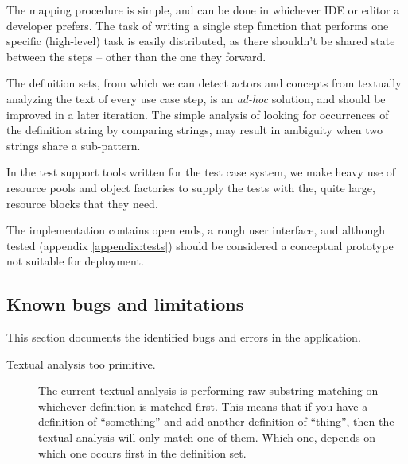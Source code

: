 \noindent The mapping procedure is simple, and can be done in whichever IDE or editor a developer prefers. The task of writing a single step function that performs one specific (high-level) task is easily distributed, as there shouldn't be shared state between the steps -- other than the one they forward.\medskip

\noindent The definition sets, from which we can detect actors and concepts from textually analyzing the text of every use case step, is an \emph{
ad-hoc} solution, and should be improved in a later iteration. The simple analysis of looking for occurrences of the definition string by comparing strings, may result in ambiguity when two strings share a sub-pattern.\medskip

\noindent In the test support tools written for the test case system, we make heavy use of resource pools and object factories to supply the tests with the, quite large, resource blocks that they need.\medskip

\noindent The implementation contains open ends, a rough user interface, and although tested (appendix \ref{appendix:tests}) should be considered a conceptual prototype not suitable for deployment.

\subsection{Known bugs and limitations}
This section documents the identified bugs and errors in the application.
\begin{description}
  \item[Textual analysis too primitive.] The current textual analysis is performing raw substring matching on whichever definition is matched first. This means that if you have a definition of ``something'' and add another definition of ``thing'', then the textual analysis will only match one of them. Which one, depends on which one occurs first in the definition set.
\end{description}

